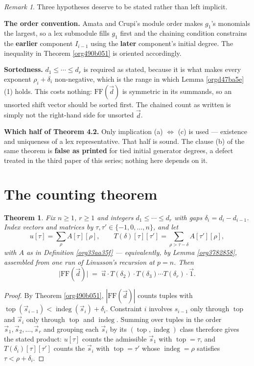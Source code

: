 \documentclass[11pt, a4paper, abstract=yes]{scrartcl}
\theoremstyle{definition}
\theoremstyle{remark}
\newtheorem{remark}[definition]{Remark}
\theoremstyle{plain}
\newtheorem{theorem}[definition]{Theorem}
\newcommand{\vek}[1]{\boldsymbol{#1}}
\newcommand{\indeg}{\operatorname{indeg}}
\newcommand{\tp}{\operatorname{top}}
\renewcommand{\vek}[1]{\vec{#1}}
\begin{document}
\begin{remark}
Three hypotheses deserve to be stated rather than left implicit.

\textbf{The order convention.} Amata and Crupi's module order makes \(g_1\)'s monomials the largest, so a
lex submodule fills \(g_1\) first and the chaining condition constrains the \textbf{earlier} component
\(I_{i-1}\) using the \textbf{later} component's initial degree. The inequality in Theorem \ref{org490b051}
is oriented accordingly.

\textbf{Sortedness.} \(d_1\le\cdots\le d_r\) is required as stated, because it is what makes every exponent
\(\rho_i+\delta_i\) non-negative, which is the range in which Lemma \ref{orgd47ba5e}(1) holds. This
costs nothing: \(\mathrm{FF}(\vek d)\) is symmetric in its summands, so an unsorted shift vector should be
sorted first. The chained count as written is simply not the right-hand side for unsorted \(\vek d\).

\textbf{Which half of Theorem 4.2.} Only implication (a) \(\Leftrightarrow\) (c) is used --- existence and
uniqueness of a lex representative. That half is sound. The clause (b) of the same theorem is
\textbf{false as printed} for tied initial generator degrees, a defect treated in the third paper of this
series; nothing here depends on it.
\label{orgb83d4a5}
\end{remark}
\section{The counting theorem}
\label{sec:orgb7feaea}
\begin{theorem}
Fix \(n\ge1\), \(r\ge1\) and integers \(d_1\le\cdots\le d_r\) with gaps \(\delta_i=d_i-d_{i-1}\).
Index vectors and matrices by \(\tau,\tau'\in\lbrace-1,0,\dots,n\rbrace\), and let
\[
  u[\tau]=\sum_\rho A[\tau][\rho],\qquad
  T(\delta)[\tau][\tau']=\sum_{\rho>\tau-\delta}A[\tau'][\rho],
\]
with \(A\) as in Definition \ref{org33aa35f} --- equivalently, by Lemma \ref{org3782858}, assembled from one
run of Linusson's recursion at \(p=n\). Then
\[
  \lvert\mathrm{FF}(\vek d)\rvert\;=\;\vek u\cdot T(\delta_2)\cdot T(\delta_3)\cdots T(\delta_r)\cdot\vek 1 .
\]
\label{org989e5d9}
\end{theorem}

\begin{proof}
By Theorem \ref{org490b051}, \(|\mathrm{FF}(\vek d)|\) counts tuples with
\(\tp(\vek s_{i-1})<\indeg(\vek s_i)+\delta_i\). Constraint \(i\) involves \(s_{i-1}\) only through \(\tp\) and
\(\vek s_i\) only through \(\tp\) and \(\indeg\). Summing over tuples in the order \(\vek s_1,\vek s_2,\dots,\vek s_r\)
and grouping each \(\vek s_i\) by its \((\tp,\indeg)\) class therefore gives the stated product: \(u[\tau]\)
counts the admissible \(\vek s_1\) with \(\tp=\tau\), and \(T(\delta_i)[\tau][\tau']\) counts the \(\vek s_i\)
with \(\tp=\tau'\) whose \(\indeg=\rho\) satisfies \(\tau<\rho+\delta_i\).
\end{proof}
\end{document}
